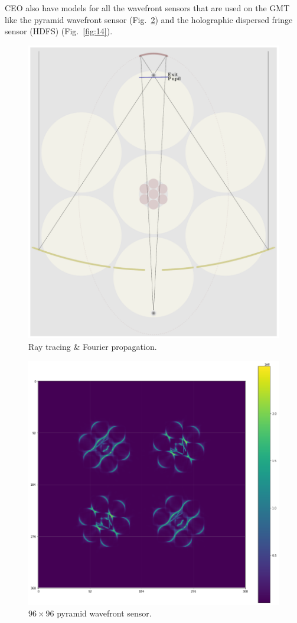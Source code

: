 \documentclass[]{AO4ELT}  %
\begin{document}
CEO also have models for all the wavefront sensors that are used on the GMT like the pyramid wavefront sensor (Fig.~\ref{fig:13}) and the holographic dispersed fringe sensor (HDFS) (Fig.~\ref{fig:14}).


\begin{figure}
   \centering
   \includegraphics[width=0.6\linewidth]{./figures/ray_tracing.pdf}
   \caption{Ray tracing \& Fourier propagation.}
   \label{fig:12}
\end{figure}

\begin{figure}
   \centering
   \includegraphics[trim=1cm 2cm 5cm 2cm,clip,width=0.6\linewidth]{./figures/pyramid.png}
   \caption{$96\times 96$ pyramid wavefront sensor.}
   \label{fig:13}
\end{figure}
\end{document}

